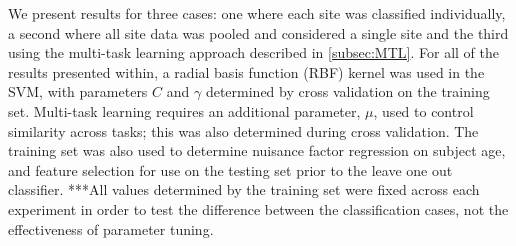 \documentclass{llncs}
\begin{document}
We present results for three cases: one where each site was classified individually, a second where all site data was pooled and considered a single site and the third using the multi-task learning approach described in \ref{subsec:MTL}. For all of the results presented within, a radial basis function (RBF) kernel was used in the SVM, with parameters $C$ and $\gamma$ determined by cross validation on the training set. Multi-task learning requires an additional parameter, $\mu$, used to control similarity across tasks; this was also determined during cross validation. The training set was also used to determine nuisance factor regression on subject age, and feature selection for use on the testing set prior to the leave one out classifier.  ***All values determined by the training set were fixed across each experiment in order to test the difference between the classification cases, not the effectiveness of parameter tuning.

\end{document}
